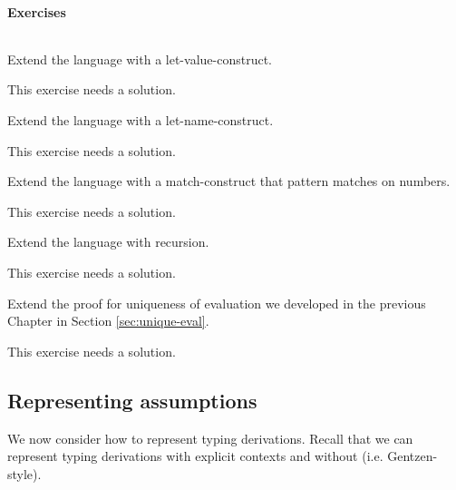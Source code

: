 
\paragraph{Exercises}$\;$\\
\begin{Exercise}
Extend the language with a let-value-construct.
\end{Exercise}
\begin{Answer}
This exercise needs a solution.
\end{Answer}

\begin{Exercise}
Extend the language with a let-name-construct.
\end{Exercise}
\begin{Answer}
This exercise needs a solution.
\end{Answer}

\begin{Exercise}
Extend the language with a match-construct that pattern matches on numbers.
\end{Exercise}
\begin{Answer}
This exercise needs a solution.
\end{Answer}

\begin{Exercise}
Extend the language with recursion.
\end{Exercise}
\begin{Answer}
This exercise needs a solution.
\end{Answer}


\begin{Exercise}
Extend the proof for uniqueness of evaluation we developed in the
previous Chapter in Section \ref{sec:unique-eval}.
\end{Exercise}
\begin{Answer}
This exercise needs a solution.
\end{Answer}

\subsection{Representing assumptions }\label{sec:HOAS-Assumptions}
We now consider how to represent typing derivations. Recall that we can
represent typing derivations with explicit contexts and without
(i.e. Gentzen-style).

